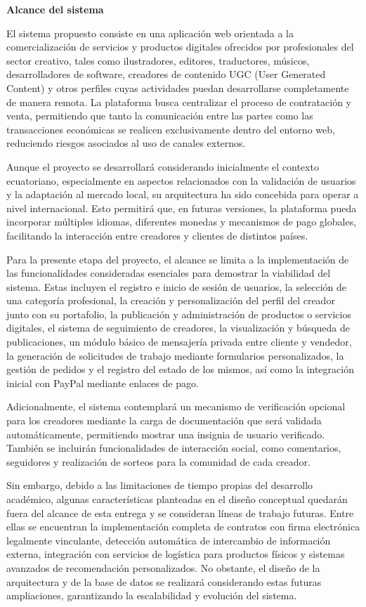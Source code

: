 \documentclass[
]{article}
\begin{document}
\textbf{Alcance del sistema}

El sistema propuesto consiste en una aplicación web orientada a la
comercialización de servicios y productos digitales ofrecidos por
profesionales del sector creativo, tales como ilustradores, editores,
traductores, músicos, desarrolladores de software, creadores de
contenido UGC (User Generated Content) y otros perfiles cuyas
actividades puedan desarrollarse completamente de manera remota. La
plataforma busca centralizar el proceso de contratación y venta,
permitiendo que tanto la comunicación entre las partes como las
transacciones económicas se realicen exclusivamente dentro del entorno
web, reduciendo riesgos asociados al uso de canales externos.

Aunque el proyecto se desarrollará considerando inicialmente el contexto
ecuatoriano, especialmente en aspectos relacionados con la validación de
usuarios y la adaptación al mercado local, su arquitectura ha sido
concebida para operar a nivel internacional. Esto permitirá que, en
futuras versiones, la plataforma pueda incorporar múltiples idiomas,
diferentes monedas y mecanismos de pago globales, facilitando la
interacción entre creadores y clientes de distintos países.

Para la presente etapa del proyecto, el alcance se limita a la
implementación de las funcionalidades consideradas esenciales para
demostrar la viabilidad del sistema. Estas incluyen el registro e inicio
de sesión de usuarios, la selección de una categoría profesional, la
creación y personalización del perfil del creador junto con su
portafolio, la publicación y administración de productos o servicios
digitales, el sistema de seguimiento de creadores, la visualización y
búsqueda de publicaciones, un módulo básico de mensajería privada entre
cliente y vendedor, la generación de solicitudes de trabajo mediante
formularios personalizados, la gestión de pedidos y el registro del
estado de los mismos, así como la integración inicial con PayPal
mediante enlaces de pago.

Adicionalmente, el sistema contemplará un mecanismo de verificación
opcional para los creadores mediante la carga de documentación que será
validada automáticamente, permitiendo mostrar una insignia de usuario
verificado. También se incluirán funcionalidades de interacción social,
como comentarios, seguidores y realización de sorteos para la comunidad
de cada creador.

Sin embargo, debido a las limitaciones de tiempo propias del desarrollo
académico, algunas características planteadas en el diseño conceptual
quedarán fuera del alcance de esta entrega y se consideran líneas de
trabajo futuras. Entre ellas se encuentran la implementación completa de
contratos con firma electrónica legalmente vinculante, detección
automática de intercambio de información externa, integración con
servicios de logística para productos físicos y sistemas avanzados de
recomendación personalizados. No obstante, el diseño de la arquitectura
y de la base de datos se realizará considerando estas futuras
ampliaciones, garantizando la escalabilidad y evolución del sistema.
\end{document}
